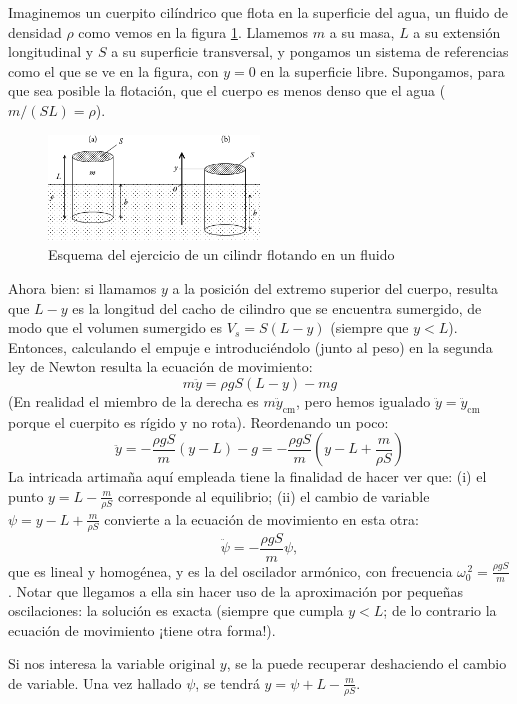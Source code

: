 \documentclass[a4paper,spanish]{article}
\numberwithin{equation}{section}
\begin{document}
Imaginemos un cuerpito cilíndrico que flota en la superficie del agua, un fluido de densidad $\rho$ como vemos en la figura \ref{fig:flotador}. Llamemos $m$ a su masa, $L$ a su extensión longitudinal y $S$ a su superficie transversal, y pongamos un sistema de referencias como el que se ve en la figura, con $y=0$ en la superficie libre. Supongamos, para que sea posible la flotación, que el cuerpo es menos denso que el agua ($m/(SL)=\rho$). 

\begin{figure}[H]
  \centering
  \includegraphics[width=0.5\textwidth]{Imagenes/flotador.png}
  \caption{Esquema del ejercicio de un cilindr flotando en un fluido}
 \label{fig:flotador}
\end{figure}

Ahora bien: si llamamos $y$ a la posición del extremo superior del cuerpo, resulta que $L-y$ es la longitud del cacho de cilindro que se encuentra sumergido, de modo que el volumen sumergido es $V_s = S(L-y)$ (siempre que $y<L$). Entonces, calculando el empuje e introduciéndolo (junto al peso) en la segunda ley de Newton resulta la ecuación de movimiento:
		\[
			m\ddot{y} = \rho g S (L-y) - mg
		\]
(En realidad el miembro de la derecha es $m\ddot{y}_\text{cm}$, pero hemos igualado $\ddot{y}=\ddot{y}_\text{cm}$ porque el cuerpito es rígido y no rota). Reordenando un poco:
		\[
			\ddot{y} = -\frac{\rho gS}{m} (y-L) - g =
				-\frac{\rho g S}{m}\left(y-L +\frac{m}{\rho S}\right)
		\]
La intricada artimaña aquí empleada tiene la finalidad de hacer ver que: (i) el punto $y= L-\frac{m}{\rho S}$ corresponde al equilibrio; (ii) el cambio de variable $\psi=y-L +\frac{m}{\rho S}$ convierte a la ecuación de movimiento en esta otra:
		\[
			\ddot{\psi} = -\frac{\rho g S}{m}\psi,
		\]
que es lineal y homogénea, y es la del oscilador armónico, con frecuencia $\omega_0^{\,2}=\frac{\rho g S}{m}$. Notar que llegamos a ella sin hacer uso de la aproximación por pequeñas oscilaciones: la solución es exacta (siempre que cumpla $y<L$; de lo contrario la ecuación de movimiento ¡tiene otra forma!).

Si nos interesa la variable original $y$, se la puede recuperar deshaciendo el cambio de variable. Una vez hallado $\psi$, se tendrá $y=\psi + L -\frac{m}{\rho S}$.
\end{document}
